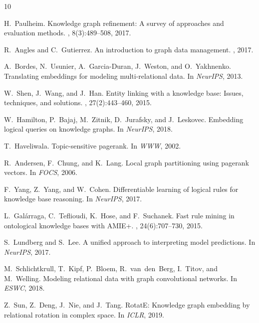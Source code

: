 \documentclass[10pt,twocolumn]{article}
\begin{document}
\balance


\begin{thebibliography}{10}

H.~Paulheim.
\newblock Knowledge graph refinement: A survey of approaches and evaluation methods.
, 8(3):489--508, 2017.

R.~Angles and C.~Gutierrez.
\newblock An introduction to graph data management.
, 2017.

A.~Bordes, N.~Usunier, A.~Garcia-Duran, J.~Weston, and O.~Yakhnenko.
\newblock Translating embeddings for modeling multi-relational data.
\newblock In {\em NeurIPS}, 2013.

W.~Shen, J.~Wang, and J.~Han.
\newblock Entity linking with a knowledge base: Issues, techniques, and solutions.
, 27(2):443--460, 2015.

W.~Hamilton, P.~Bajaj, M.~Zitnik, D.~Jurafsky, and J.~Leskovec.
\newblock Embedding logical queries on knowledge graphs.
\newblock In {\em NeurIPS}, 2018.

T.~Haveliwala.
\newblock Topic-sensitive pagerank.
\newblock In {\em WWW}, 2002.

R.~Andersen, F.~Chung, and K.~Lang.
\newblock Local graph partitioning using pagerank vectors.
\newblock In {\em FOCS}, 2006.

F.~Yang, Z.~Yang, and W.~Cohen.
\newblock Differentiable learning of logical rules for knowledge base reasoning.
\newblock In {\em NeurIPS}, 2017.

L.~Galárraga, C.~Teflioudi, K.~Hose, and F.~Suchanek.
\newblock Fast rule mining in ontological knowledge bases with AMIE+.
, 24(6):707--730, 2015.

S.~Lundberg and S.~Lee.
\newblock A unified approach to interpreting model predictions.
\newblock In {\em NeurIPS}, 2017.

M.~Schlichtkrull, T.~Kipf, P.~Bloem, R.~van~den~Berg, I.~Titov, and M.~Welling.
\newblock Modeling relational data with graph convolutional networks.
\newblock In {\em ESWC}, 2018.

Z.~Sun, Z.~Deng, J.~Nie, and J.~Tang.
\newblock RotatE: Knowledge graph embedding by relational rotation in complex space.
\newblock In {\em ICLR}, 2019.


\end{thebibliography}
\end{document}
